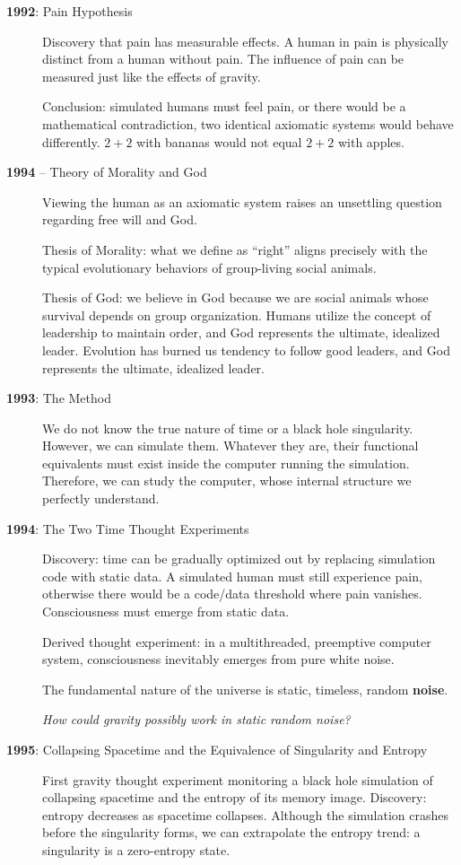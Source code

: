 \begin{description}
\item[\textbf{1992}: Pain Hypothesis]
  Discovery that pain has measurable effects. A human in pain is physically distinct from a human without pain. The influence of pain can be measured just like the effects of gravity.

  Conclusion: simulated humans must feel pain, or there would be a mathematical contradiction, two identical axiomatic systems would behave differently. $2+2$ with bananas would not equal $2+2$ with apples.


\item[\textbf{1994} -- Theory of Morality and God]

  Viewing the human as an axiomatic system raises an unsettling question regarding free will and God.

  Thesis of Morality: what we define as ``right'' aligns precisely with the typical evolutionary behaviors of group-living social animals.  

  Thesis of God: we believe in God because we are social animals whose survival depends on group organization. Humans utilize the concept of leadership to maintain order, and God represents the ultimate, idealized leader. Evolution has burned
  us tendency to follow good leaders, and God represents the ultimate, idealized leader.
  
  
\item[\textbf{1993}: The Method]
  We do not know the true nature of time or a black hole singularity. However, we can simulate them. Whatever they are, their functional equivalents must exist inside the computer running the simulation. Therefore, we can study the computer, whose internal structure we perfectly understand.

\item[\textbf{1994}: The Two Time Thought Experiments]
  Discovery: time can be gradually optimized out by replacing simulation code with static data. A simulated human must still experience pain, otherwise there would be a code/data threshold where pain vanishes. Consciousness must emerge from static data.

  Derived thought experiment: in a multithreaded, preemptive computer system, consciousness inevitably emerges from pure white noise.

  The fundamental nature of the universe is static, timeless, random \textbf{noise}.

  \textit{How could gravity possibly work in static random noise?}

\item[\textbf{1995}: Collapsing Spacetime and the Equivalence of Singularity and Entropy]
  First gravity thought experiment monitoring a black hole simulation of collapsing spacetime and the entropy of its memory image. Discovery: entropy decreases as spacetime collapses. Although the simulation crashes before the singularity forms, we can extrapolate the entropy trend: a singularity is a zero-entropy state.


\end{description}
